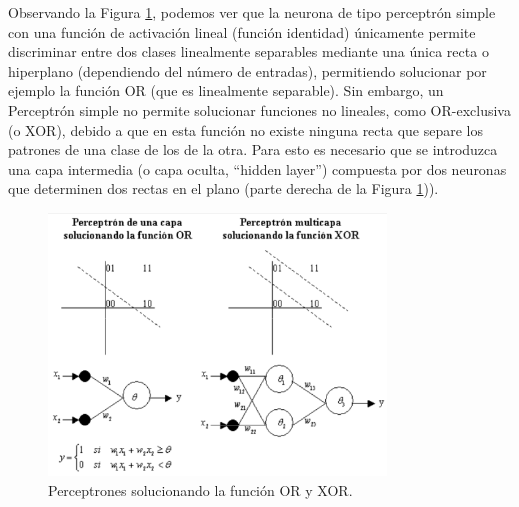 \documentclass[12pt,a4paper]{article}
\begin{document}
\begin{sloppypar}
Observando la Figura \ref{fig:ann_2}, podemos ver que la neurona de tipo perceptrón simple con una función de activación lineal (función identidad) únicamente permite discriminar entre dos clases linealmente separables mediante una única recta o hiperplano (dependiendo del número de entradas), permitiendo solucionar por ejemplo la función OR (que es linealmente separable). Sin embargo, un Perceptrón simple no permite solucionar funciones no lineales, como OR-exclusiva (o XOR), debido a que en esta función no existe ninguna recta que separe los patrones de una clase de los de la otra. Para esto es necesario que se introduzca una capa intermedia (o capa oculta, ``hidden layer'') compuesta por dos neuronas que determinen dos rectas en el plano (parte derecha de la Figura \ref{fig:ann_2})\cite{ANN_24}).

\begin{figure}[H]    %
 \centering
 \includegraphics[width=0.8\textwidth]{images/ANN/2-ANN.png}
 \caption[Perceptrones solucionando la función OR y XOR.]{Perceptrones solucionando la función OR y XOR\cite{ANN_24}.\protect\footnotemark}
 \label{fig:ann_2}
\end{figure}


\end{sloppypar}
\end{document}
